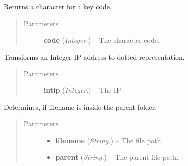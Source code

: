 \documentclass[letterpaper,10pt,english]{sphinxmanual}
\begin{document}
\begin{fulllineitems}
\label{api:utils.GetSendkeys}
Returns a character for a key code.
\begin{quote}\begin{description}
\item[{Parameters}] \leavevmode
\textbf{code} (\emph{Integer.}) -- The character code.

\end{description}\end{quote}

\end{fulllineitems}


\begin{fulllineitems}
\label{api:utils.IntToDottedIP}
Transforms an Integer IP address to dotted representation.
\begin{quote}\begin{description}
\item[{Parameters}] \leavevmode
\textbf{intip} (\emph{Integer.}) -- The IP

\end{description}\end{quote}

\end{fulllineitems}


\begin{fulllineitems}
\label{api:utils.IsSubtree}
Determines, if filename is inside the parent folder.
\begin{quote}\begin{description}
\item[{Parameters}] \leavevmode\begin{itemize}
\item {} 
\textbf{filename} (\emph{String.}) -- The file path.

\item {} 
\textbf{parent} (\emph{String.}) -- The parent file path.

\end{itemize}

\end{description}\end{quote}

\end{fulllineitems}
\end{document}

